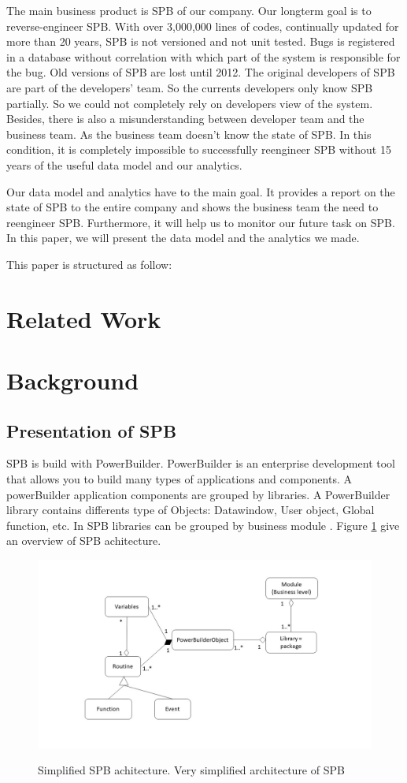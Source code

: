 \documentclass[10pt,conference]{IEEEtran}
\begin{document}
The main business product is SPB of our company. Our longterm goal is to reverse-engineer SPB.  With over 3,000,000 lines of codes, continually updated for more than 20 years,  SPB is not versioned and not unit tested. Bugs is registered in a database without correlation with which part of the system is responsible for the bug. Old versions of SPB are lost until 2012. The original developers of SPB are part of the developers' team. So the currents developers only know SPB partially.  So we could not completely rely on developers view of the system. Besides, there is also a misunderstanding between developer team and the business team. As the business team doesn't know the state of SPB.  In this condition, it is completely impossible to successfully reengineer SPB without  15 years of the useful data model and our analytics.


Our data model and analytics have to the main goal. It provides a report on the state of SPB to the entire company and shows the business team the need to reengineer  SPB. Furthermore, it will help us to monitor our future task on SPB.  In this paper, we will present the data model and the analytics we made.


This paper is structured as follow: 


\section{Related Work}\label{sec:related-work}

\section{Background}\label{sec:background}
\subsection{Presentation of SPB}
SPB is build with PowerBuilder. PowerBuilder is an enterprise development tool that allows you to build many types of applications and components. A powerBuilder application components are grouped by libraries.   A PowerBuilder library contains differents type of Objects: Datawindow, User object, Global function, etc.    In SPB libraries  can be grouped by business module . Figure  \ref{fig:pbArchitecture} give an overview of SPB achitecture.
\begin{figure}[!ht]
    \centering
    {\includegraphics[width=0.9\linewidth]{images/pbArchitecture.jpg}}
    \caption{Simplified SPB achitecture.
Very simplified architecture of SPB}\label{fig:pbArchitecture}
 \end{figure} 
\end{document}
